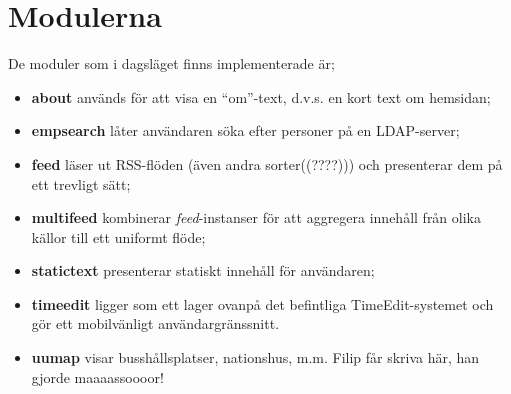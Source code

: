 \section{Modulerna}
De moduler som i dagsläget finns implementerade är;

\begin{itemize}
  \item {\bf about} används för att visa en ``om''-text, d.v.s. en kort
    text om hemsidan;

  \item {\bf empsearch} låter användaren söka efter personer på en
    LDAP-server;

  \item {\bf feed} läser ut RSS-flöden (även andra sorter((????))) och
    presenterar dem på ett trevligt sätt;

  \item {\bf multifeed} kombinerar \emph{feed}-instanser för att
    aggregera innehåll från olika källor till ett uniformt flöde;

  \item {\bf statictext} presenterar statiskt innehåll för användaren;

  \item {\bf timeedit} ligger som ett lager ovanpå det befintliga
    TimeEdit-systemet och gör ett mobilvänligt användargränssnitt.

  \item {\bf uumap} visar busshållsplatser, nationshus, m.m. Filip får
    skriva här, han gjorde maaaassoooor!

\end{itemize}

%
%
%
%
%
%
%

